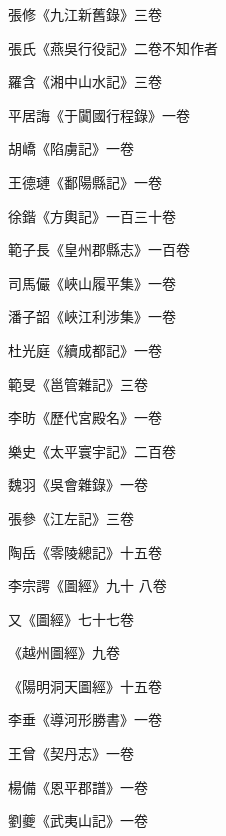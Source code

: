 \begin{pinyinscope}
 張修《九江新舊錄》三卷



 張氏《燕吳行役記》二卷不知作者



 羅含《湘中山水記》三卷



 平居誨《于闐國行程錄》一卷



 胡嶠《陷虜記》一卷



 王德璉《鄱陽縣記》一卷



 徐鍇《方輿記》一百三十卷



 範子長《皇州郡縣志》一百卷



 司馬儼《峽山履平集》一卷



 潘子韶《峽江利涉集》一卷



 杜光庭《續成都記》一卷



 範旻《邕管雜記》三卷



 李昉《歷代宮殿名》一卷



 樂史《太平寰宇記》二百卷



 魏羽《吳會雜錄》一卷



 張參《江左記》三卷



 陶岳《零陵總記》十五卷



 李宗諤《圖經》九十
 八卷



 又《圖經》七十七卷



 《越州圖經》九卷



 《陽明洞天圖經》十五卷



 李垂《導河形勝書》一卷



 王曾《契丹志》一卷



 楊備《恩平郡譜》一卷



 劉夔《武夷山記》一卷




\end{pinyinscope}
